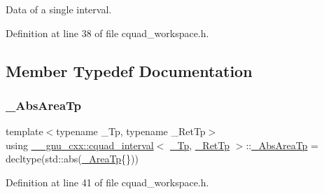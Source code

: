 Data of a single interval. 

Definition at line 38 of file cquad\+\_\+workspace.\+h.



\subsection{Member Typedef Documentation}
\mbox{\label{struct____gnu__cxx_1_1cquad__interval_a3d2a1bbd0064e2a6c6edbcd514585311}} 
\subsubsection{\texorpdfstring{\+\_\+\+Abs\+Area\+Tp}{\_AbsAreaTp}}
{\footnotesize\ttfamily template$<$typename \+\_\+\+Tp, typename \+\_\+\+Ret\+Tp$>$ \\
using \hyperlink{struct____gnu__cxx_1_1cquad__interval}{\+\_\+\+\_\+gnu\+\_\+cxx\+::cquad\+\_\+interval}$<$ \hyperlink{namespace____gnu__cxx_a3b19a9c800ca194374ef9172290f7d79}{\+\_\+\+Tp}, \hyperlink{namespace____gnu__cxx_a886e03ece3d53ff7fa6c098a40f93fa5}{\+\_\+\+Ret\+Tp} $>$\+::\hyperlink{struct____gnu__cxx_1_1cquad__interval_a3d2a1bbd0064e2a6c6edbcd514585311}{\+\_\+\+Abs\+Area\+Tp} =  decltype(std\+::abs(\hyperlink{struct____gnu__cxx_1_1cquad__interval_aceac510aa3323d55b31555f96133cb40}{\+\_\+\+Area\+Tp}\{\}))}



Definition at line 41 of file cquad\+\_\+workspace.\+h.

\mbox{\label{struct____gnu__cxx_1_1cquad__interval_aceac510aa3323d55b31555f96133cb40}} 
